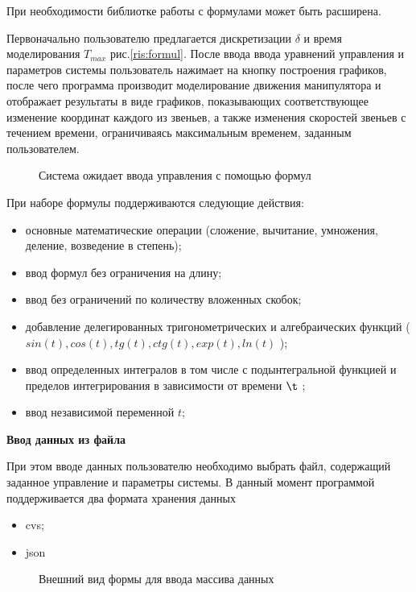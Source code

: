 При необходимости библиотке работы с формулами может быть расширена.

Первоначально пользователю предлагается дискретизации $\delta$  и время моделирования  $T_{max}$ рис.\eqref{ris:formul}. После ввода ввода уравнений управления и параметров системы пользователь нажимает на кнопку построения графиков, после чего программа производит моделирование движения манипулятора и отображает результаты в виде графиков, показывающих соответствующее изменение координат каждого из звеньев, а также изменения скоростей звеньев с течением времени, ограничиваясь максимальным временем, заданным пользователем.

\begin{figure}[h]
\caption{Система ожидает ввода управления с помощью формул}
\label{ris:formul}
\end{figure}

При наборе формулы поддерживаются следующие действия:
\begin{itemize}
\item{основные математические операции (сложение, вычитание, умножения, деление, возведение в степень);}
\item{ввод формул без ограничения на длину;}
\item{ввод без ограничений по количеству вложенных скобок;}
\item{добавление делегированных тригонометрических и алгебраических функций ($sin(t), cos(t), tg(t), ctg(t), exp(t), ln(t)$ );}
\item{ввод определенных интегралов в том числе с подынтегральной функцией и пределов интегрирования в зависимости от времени $\t$ ;}
\item{ввод независимой переменной $t$;}
\end{itemize}

\textbf{Ввод данных из файла}

При этом вводе данных пользователю необходимо выбрать файл, содержащий заданное управление и параметры системы. В данный момент программой поддерживается два формата хранения данных

\begin{itemize}
\item{cvs;}
\item{json}
\end{itemize}

\begin{figure}[h]
\caption{Внешний вид формы для ввода массива данных}
\label{ris:mass}
\end{figure}

